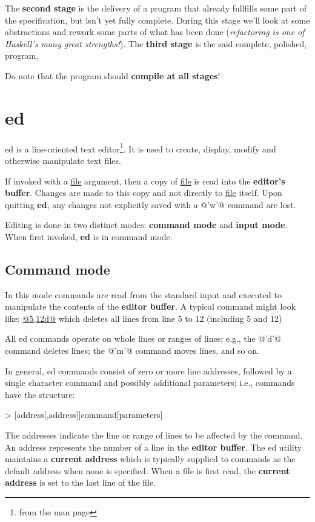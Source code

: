 \documentclass[a4paper,10pt]{article}
\begin{document}
The \textbf{second stage} is the delivery of a program that already fullfills
some part of the specification, but isn't yet fully complete. During this stage
we'll look at some abstractions and rework some parts of what has been done
(\emph{refactoring is one of Haskell's many great strengths!}). The
\textbf{third stage} is the said complete, polished, program.

Do note that the program should \textbf{compile at all stages}!

\section{ed}\label{sec:ed}

ed is a line-oriented text editor\footnote{from the man page}. It is
used to create, display, modify and otherwise manipulate text files.

If invoked with a \underline{file} argument, then a copy of \underline{file} is
read into the \textbf{editor's buffer}. Changes are made to this copy and not
directly to \underline{file} itself. Upon quitting \textbf{ed}, any changes not
explicitly saved with a @'w'@ command are lost.

Editing is done in two distinct modes: \textbf{command mode} and \textbf{input mode}. When
first invoked, \textbf{ed} is in command mode.

\subsection{Command mode}\label{sec:command}

In this mode commands are read from the standard input and executed to
manipulate the contents of the \textbf{editor buffer}. A typical command might look
like: \underline{@5,12d@} which deletes all lines from line 5 to 12 (including 5 and 12)

All ed commands operate on whole lines or ranges of lines; e.g., the @'d'@
command deletes lines; the @'m'@ command moves lines, and so on.

In general, ed commands consist of zero or more line addresses, followed by a
single character command and possibly additional parameters; i.e., commands
have the structure:

> [address[,address]]command[parameters]

The addresses indicate the line or range of lines to be affected by the
command. An address represents the number of a line in the \textbf{editor
buffer}. The ed utility maintains a \textbf{current address} which is typically supplied
to commands as the default address when none is specified.  When a file is
first read, the \textbf{current address} is set to the last line of the file.
\end{document}
